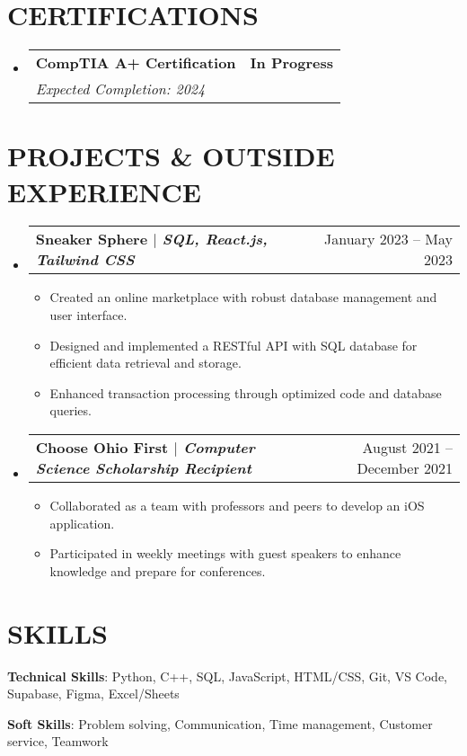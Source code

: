 \documentclass[letterpaper,11pt]{article}
\makeatletter
\newcommand{\resumeSubheading}[4]{
  \vspace{-1pt}\item
    \begin{tabular*}{0.97\textwidth}[t]{l@{\extracolsep{\fill}}r}
      \textbf{#1} & \textbf{#2} \\
      \textit{\small#3} & \textit{\small #4} \\
    \end{tabular*}\vspace{-5pt}
}
\newcommand{\projectItem}[1]{
  \item\small{#1}
}
\newcommand{\projectSubHeading}[2]{
  \vspace{-1pt}\item
    \begin{tabular*}{0.97\textwidth}[t]{l@{\extracolsep{\fill}}r}
      \textbf{#1} & #2 \\
    \end{tabular*}\vspace{-5pt}
}
\newcommand{\resumeItemListStart}{\begin{itemize}[leftmargin=*,label=\textbullet]}
\newcommand{\resumeItemListEnd}{\end{itemize}}
\makeatother
\begin{document}
\section{CERTIFICATIONS}
  \begin{itemize}[leftmargin=0pt,label={}]
    \resumeSubheading
      {CompTIA A+ Certification}{In Progress}{Expected Completion: 2024}{}
  \end{itemize}

\section{PROJECTS \& OUTSIDE EXPERIENCE}
  \begin{itemize}[leftmargin=0pt,label={}]
    \projectSubHeading
      {\textbf{Sneaker Sphere} $|$ \emph{SQL, React.js, Tailwind CSS}}{January 2023 -- May 2023}
      \resumeItemListStart
        \projectItem
          {Created an online marketplace with robust database management and user interface.}
        \projectItem
          {Designed and implemented a RESTful API with SQL database for efficient data retrieval and storage.}
        \projectItem
          {Enhanced transaction processing through optimized code and database queries.}
      \resumeItemListEnd
      \projectSubHeading
      {\textbf{Choose Ohio First} $|$ \emph{Computer Science Scholarship Recipient}}{August 2021 -- December 2021}
      \resumeItemListStart
        \projectItem
          {Collaborated as a team with professors and peers to develop an iOS application.}
        \projectItem
            {Participated in weekly meetings with guest speakers to enhance knowledge and prepare for conferences.}
      \resumeItemListEnd
  \end{itemize}

\section{SKILLS}
    \small{\textbf{Technical Skills}{: Python, C++, SQL, JavaScript, HTML/CSS, Git, VS Code, Supabase, Figma, Excel/Sheets}}
    
    \small{\textbf{Soft Skills}{: Problem solving, Communication, Time management, Customer service, Teamwork}}

\end{document}
